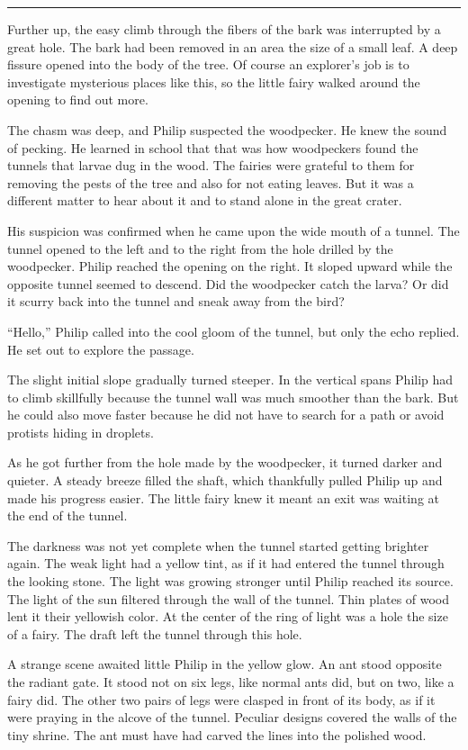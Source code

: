 \documentclass[10pt]{memoir}
\renewcommand{\pfbreakdisplay}{\bigskip \ding{166} \bigskip}
\newcommand{\secbreak}{\fancybreak{\pfbreakdisplay}}
\begin{document}
\secbreak

Further up, the easy climb through the fibers of the bark was interrupted by a
great hole. The bark had been removed in an area the size of a small leaf. A
deep fissure opened into the body of the tree. Of course an explorer's job is
to investigate mysterious places like this, so the little fairy walked around
the opening to find out more.

The chasm was deep, and Philip suspected the woodpecker. He knew the sound of
pecking. He learned in school that that was how woodpeckers found the tunnels
that larvae dug in the wood. The fairies were grateful to them for removing
the pests of the tree and also for not eating leaves. But it was a different
matter to hear about it and to stand alone in the great crater.

His suspicion was confirmed when he came upon the wide mouth of a tunnel. The
tunnel opened to the left and to the right from the hole drilled by the
woodpecker. Philip reached the opening on the right. It sloped upward while the
opposite tunnel seemed to descend. Did the woodpecker catch the larva? Or did
it scurry back into the tunnel and sneak away from the bird?

``Hello,'' Philip called into the cool gloom of the tunnel, but only the echo
replied. He set out to explore the passage.

The slight initial slope gradually turned steeper. In the vertical spans Philip
had to climb skillfully because the tunnel wall was much smoother than the
bark. But he could also move faster because he did not have to search for a
path or avoid protists hiding in droplets.

As he got further from the hole made by the woodpecker, it turned darker and
quieter. A steady breeze filled the shaft, which thankfully pulled Philip up
and made his progress easier. The little fairy knew it meant an exit was
waiting at the end of the tunnel.

The darkness was not yet complete when the tunnel started getting brighter
again. The weak light had a yellow tint, as if it had entered the tunnel
through the looking stone. The light was growing stronger until Philip reached
its source. The light of the sun filtered through the wall of the tunnel. Thin
plates of wood lent it their yellowish color. At the center of the ring of
light was a hole the size of a fairy. The draft left the tunnel through this
hole.

A strange scene awaited little Philip in the yellow glow. An ant stood opposite
the radiant gate. It stood not on six legs, like normal ants did, but on two,
like a fairy did. The other two pairs of legs were clasped in front of its
body, as if it were praying in the alcove of the tunnel. Peculiar designs
covered the walls of the tiny shrine. The ant must have had carved the lines
into the polished wood.
\end{document}
